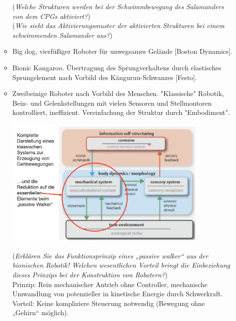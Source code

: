\begin{enumerate}
\begin{itemize}
\begin{center}
        \end{center}
        (\dangersign \textit{Welche Strukturen werden bei der Schwimmbewegung des Salamanders von dem CPGs aktiviert?})\\
        (\dangersign \textit{Wie sieht das Aktivierungsmuster der aktivierten Strukturen bei einem schwimmenden Salamander aus?})
        \item Big dog, vierfüßiger Roboter für unwegsames Gelände [Boston Dynamics].
        \item Bionic Kangaroo. Übertragung des Sprungverhaltens durch elastisches Sprungelement nach Vorbild des Känguruu-Schwanzes [Festo].
        \item Zweibeinige Roboter nach Vorbild des Menschen. "Klassische" Robotik, Bein- und Gelenkstellungen mit vielen Sensoren und Stellmontoren kontrolliert, ineffizient. Vereinfachung der Struktur durch "Embodiment".\\
        \begin{center}
            \includegraphics[width=10cm]{lec9/figures/passive-walker.png}
        \end{center}
        (\dangersign \textit{Erklären Sie das Funktionsprinzip eines „passive walker“ aus der bionischen Robotik! Welchen
        wesentlichen Vorteil bringt die Einbeziehung dieses Prinzips bei der Konstruktion von Robotern?})\\
        Prinzip: Rein mechanischer Antrieb ohne Controller, mechanische Umwandlung von potenzieller in kinetische Energie durch Schwerkraft.\\
        Vorteil: Keine kompliziere Steuerung notwendig (Bewegung ohne „Gehirn“ möglich).
    \end{itemize}
\end{enumerate}
